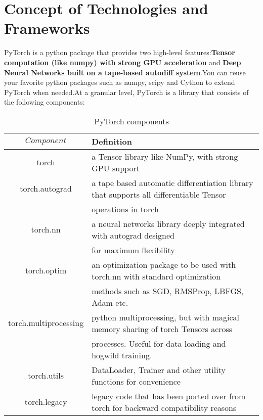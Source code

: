 \vspace{-0.3cm}


\section{Concept of Technologies and Frameworks}\label{sec:4.3}
\vspace{-0.5cm}
\noindent PyTorch is a python package that provides two high-level features:\textbf{Tensor computation (like numpy) with strong GPU acceleration} and \textbf{Deep Neural Networks built on a tape-based autodiff system}.You can reuse your favorite python packages such as numpy, scipy and Cython to extend PyTorch when needed.At a granular level, PyTorch is a library that consists of the following components:
 \begin{table}[tbp]
 	\centering
 	\caption{PyTorch components}
 	\label{tab:sample}
 	\begin{tabular}{cl}
 		\toprule
 		$Component$ 			& Definition 																			\\ \midrule
 		torch  					& a Tensor library like NumPy, with strong GPU support 									\\
 		torch.autograd 			& a tape based automatic differentiation library that supports all differentiable Tensor\\ 
 		 						& operations in torch 																	\\
 		torch.nn  				& a neural networks library deeply integrated with autograd designed 					\\ 
 								& for maximum  flexibility 																\\
 		torch.optim  			& an optimization package to be used with torch.nn with standard optimization 			\\  
 								& methods such as SGD, RMSProp, LBFGS, Adam etc.										\\
	 	torch.multiprocessing 	& python multiprocessing, but with magical memory sharing of torch Tensors across 		\\ 
	 							&  processes. Useful for data loading and hogwild training. 							\\
 		torch.utils  			& DataLoader, Trainer and other utility functions for convenience 						\\
 		torch.legacy  			& legacy code that has been ported over from torch for backward compatibility reasons 	\\
 		\bottomrule
 	\end{tabular}
 \end{table}
 
